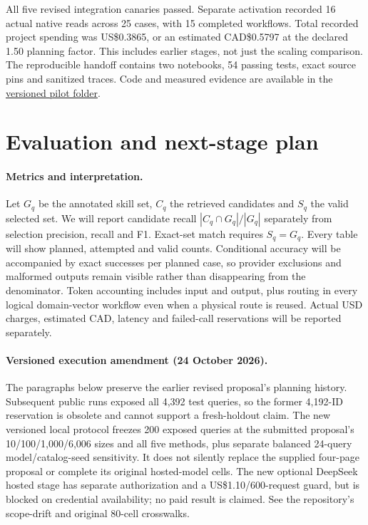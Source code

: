 \documentclass{article}
\begin{document}
All five revised integration canaries passed. Separate activation recorded 16
actual native reads across 25 cases, with 15 completed workflows. Total recorded
project spending was US\$0.3865, or an estimated CAD\$0.5797 at the declared 1.50
planning factor. This includes earlier stages, not just the scaling comparison.
The reproducible handoff contains two notebooks, 54 passing tests, exact source
pins and sanitized traces. Code and measured evidence are available in the
\href{https://github.com/speccy88/mia5150/tree/b9c9df2/skillret-pilot}{versioned pilot folder}.

\section{Evaluation and next-stage plan}
\paragraph{Metrics and interpretation.}
Let $G_q$ be the annotated skill set, $C_q$ the retrieved candidates and $S_q$ the
valid selected set. We will report candidate recall $|C_q\cap G_q|/|G_q|$ separately
from selection precision, recall and F1. Exact-set match requires $S_q=G_q$.
Every table will show planned, attempted and valid counts. Conditional accuracy
will be accompanied by exact successes per planned case, so provider exclusions
and malformed outputs remain visible rather than disappearing from the denominator.
Token accounting includes input and output, plus routing in every logical
domain-vector workflow even when a physical route is reused. Actual USD charges,
estimated CAD, latency and failed-call reservations will be reported separately.

\paragraph{Versioned execution amendment (24 October 2026).}
The paragraphs below preserve the earlier revised proposal's planning history.
Subsequent public runs exposed all 4,392 test queries, so the former 4,192-ID
reservation is obsolete and cannot support a fresh-holdout claim. The new
versioned local protocol freezes 200 exposed queries at the submitted proposal's
10/100/1,000/6,006 sizes and all five methods, plus separate balanced 24-query
model/catalog-seed sensitivity. It does not silently replace the supplied
four-page proposal or complete its original hosted-model cells. The new optional
DeepSeek hosted stage has separate authorization and a US\$1.10/600-request
guard, but is blocked on credential availability; no paid result is claimed.
See the repository's scope-drift and original 80-cell crosswalks.
\end{document}
